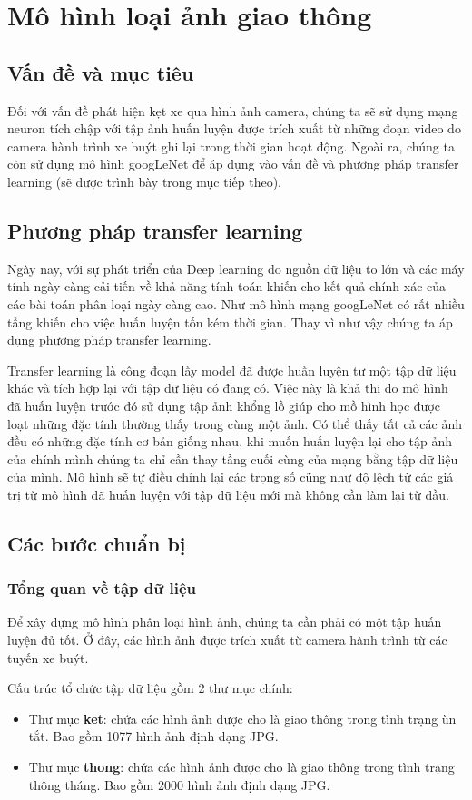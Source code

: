 \chapter{Mô hình loại ảnh giao thông}
\section{Vấn đề và mục tiêu}
	Đối với vấn đề phát hiện kẹt xe qua hình ảnh camera, chúng ta sẽ sử dụng mạng neuron tích chập với tập ảnh huấn luyện được trích xuất từ những đoạn video do camera hành trình xe buýt ghi lại trong thời gian hoạt động. Ngoài ra, chúng ta còn sử dụng mô hình googLeNet để áp dụng vào vấn đề và phương pháp transfer learning (sẽ được trình bày trong mục tiếp theo). \par
\section{Phương pháp transfer learning}
	Ngày nay, với sự phát triển của Deep learning do nguồn dữ liệu to lớn và các máy tính ngày càng cải tiến về khả năng tính toán khiến cho kết quả chính xác của các bài toán phân loại ngày càng cao. Như mô hình mạng googLeNet có rất nhiều tầng khiến cho việc huấn luyện tốn kém thời gian. Thay vì như vậy chúng ta áp dụng phương pháp transfer learning.\par
	Transfer learning là công đoạn lấy model đã được huấn luyện tư một tập dữ liệu khác \cite{transfer} và tích hợp lại với tập dữ liệu có đang có. Việc này là khả thi do mô hình đã huấn luyện trước đó sử dụng tập ảnh khổng lồ giúp cho mồ hình học được loạt những đặc tính thường thấy trong cùng một ảnh. Có thể thấy tất cả các ảnh đều có những đặc tính cơ bản giống nhau, khi muốn huấn luyện lại cho tập ảnh của chính mình chúng ta chỉ cần thay tầng cuối cùng của mạng bằng tập dữ liệu của mình. Mô hình sẽ tự điều chỉnh lại các trọng số cũng như độ lệch từ các giá trị từ mô hình đã huấn luyện với tập dữ liệu mới mà không cần làm lại từ đầu.

\section{Các bước chuẩn bị}
\subsection{Tổng quan về tập dữ liệu}
	Để xây dựng mô hình phân loại hình ảnh, chúng ta cần phải có một tập huấn luyện đủ tốt. Ở đây, các hình ảnh được trích xuất từ camera hành trình từ các tuyến xe buýt. \par
	Cấu trúc tổ chức tập dữ liệu gồm 2 thư mục chính:
	\begin{itemize}
		\item Thư mục \textbf{ket}: chứa các hình ảnh được cho là giao thông trong tình trạng ùn tắt. Bao gồm 1077 hình ảnh định dạng JPG.
		\item Thư mục \textbf{thong}: chứa các hình ảnh được cho là giao thông trong tình trạng thông tháng. Bao gồm 2000 hình ảnh định dạng JPG.
	\end{itemize}

